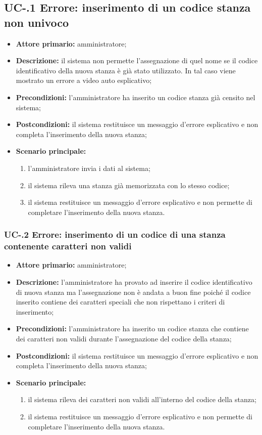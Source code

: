 \subsection{UC-.1 Errore: inserimento di un codice stanza non univoco}
\begin{itemize}
	\item \textbf{Attore primario:} amministratore;
	\item \textbf{Descrizione:} il sistema non permette l'assegnazione di quel nome se il codice identificativo della nuova stanza è già stato utilizzato. In tal caso viene mostrato un errore a video auto esplicativo;
	\item \textbf{Precondizioni:} l'amministratore ha inserito un codice stanza già censito nel sistema;
	\item \textbf{Postcondizioni:} il sistema restituisce un messaggio d'errore esplicativo e non completa l'inserimento della nuova stanza;
	\item \textbf{Scenario principale:}
	      \begin{enumerate}
	      	      \item l'amministratore invia i dati al sistema;
		      \item il sistema rileva una stanza già memorizzata con lo stesso codice;
		      \item il sistema restituisce un messaggio d'errore esplicativo e non permette di completare l'inserimento della nuova stanza.
	      \end{enumerate}
\end{itemize}



\subsubsection{UC-.2 Errore: inserimento di un codice di una stanza contenente caratteri non validi}
\begin{itemize}
	\item \textbf{Attore primario:} amministratore;
	\item \textbf{Descrizione:} l'amministratore ha provato ad inserire il codice identificativo di nuova stanza ma l'assegnazione non è andata a buon fine poiché il codice inserito contiene dei caratteri speciali che non rispettano i criteri di inserimento;
	\item \textbf{Precondizioni:} l'amministratore ha inserito un codice stanza che contiene dei caratteri non validi durante l'assegnazione del codice della stanza;
	\item \textbf{Postcondizioni:} il sistema restituisce un messaggio d'errore esplicativo e non completa l'inserimento della nuova stanza;
	\item \textbf{Scenario principale:}
	      \begin{enumerate}
		      \item il sistema rileva dei caratteri non validi all'interno del codice della stanza;
		      \item il sistema restituisce un messaggio d'errore esplicativo e non permette di completare l'inserimento della nuova stanza.
	      \end{enumerate}
\end{itemize}


